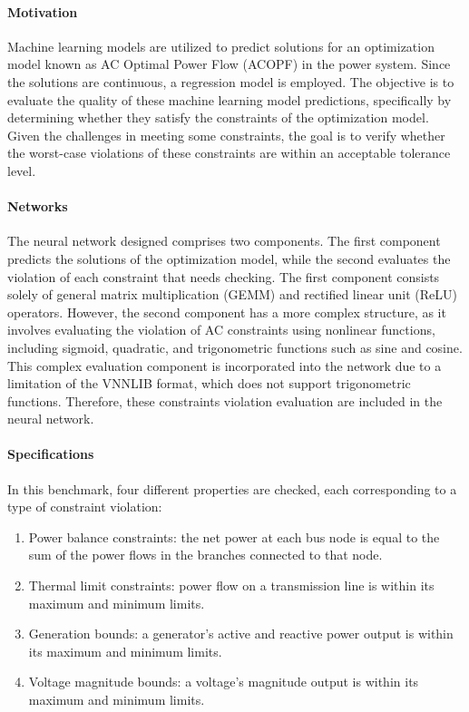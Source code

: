 \documentclass[oneside,11pt,dvipsnames]{book}
\begin{document}
\paragraph*{Motivation}
Machine learning models are utilized to predict solutions for an optimization model known as AC Optimal Power Flow (ACOPF) in the power system. Since the solutions are continuous, a regression model is employed. The objective is to evaluate the quality of these machine learning model predictions, specifically by determining whether they satisfy the constraints of the optimization model. Given the challenges in meeting some constraints, the goal is to verify whether the worst-case violations of these constraints are within an acceptable tolerance level.

\paragraph*{Networks}
The neural network designed comprises two components. The first component predicts the solutions of the optimization model, while the second evaluates the violation of each constraint that needs checking. The first component consists solely of general matrix multiplication (GEMM) and rectified linear unit (ReLU) operators. However, the second component has a more complex structure, as it involves evaluating the violation of AC constraints using nonlinear functions, including sigmoid, quadratic, and trigonometric functions such as sine and cosine. This complex evaluation component is incorporated into the network due to a limitation of the VNNLIB format, which does not support trigonometric functions. Therefore, these constraints violation evaluation are included in the neural network.

\paragraph*{Specifications}
In this benchmark, four different properties are checked, each corresponding to a type of constraint violation:
\begin{enumerate}
    \item Power balance constraints: the net power at each bus node is equal to the sum of the power flows in the branches connected to that node.
    \item Thermal limit constraints: power flow on a transmission line is within its maximum and minimum limits.
    \item Generation bounds: a generator's active and reactive power output is within its maximum and minimum limits.
    \item Voltage magnitude bounds: a voltage's magnitude output is within its maximum and minimum limits.
\end{enumerate}
\end{document}
